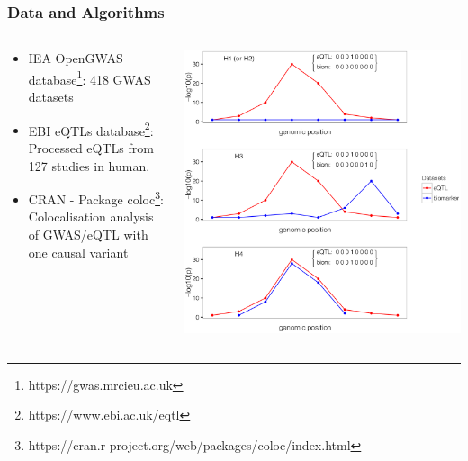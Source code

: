 \documentclass{beamer}
\begin{document}
    \begin{frame}
        \frametitle{Data and Algorithms}

        \begin{columns}
            \begin{column}{0.5\textwidth}
                \begin{itemize}
                    \item IEA OpenGWAS database\footnote{https://gwas.mrcieu.ac.uk}: 418 GWAS datasets
                    \item EBI eQTLs database\footnote{https://www.ebi.ac.uk/eqtl}: Processed eQTLs from 127 studies in human.
                    \item CRAN - Package coloc\footnote{https://cran.r-project.org/web/packages/coloc/index.html}: Colocalisation analysis of GWAS/eQTL with one causal variant
                \end{itemize}
            \end{column}
            \begin{column}{0.5\textwidth}
                \begin{center}
                    \includegraphics[width=\textwidth]{../presentation_230120_gold2022_paris/fig/pgen.1004383.g001.png}
                \end{center}
            \end{column}
        \end{columns}

    \end{frame}
\end{document}
